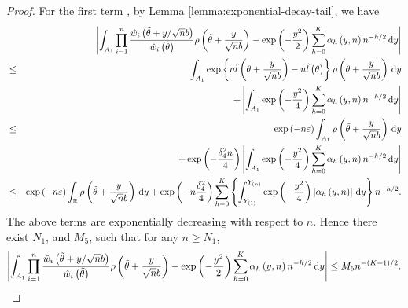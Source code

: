 \begin{proof}
For the first term%
, by Lemma \ref{lemma:exponential-decay-tail}, we have
\begin{eqnarray*}
 &  & \left|\int_{A_{1}}\prod_{i=1}^{n}\frac{\hat{w}_{i}\left(\tilde{\theta}+y/\sqrt{n}b\right)}{\hat{w}_{i}\left(\tilde{\theta}\right)}\rho\left(\tilde{\theta}+\frac{y}{\sqrt{n}b}\right)-\exp\left(-\frac{y^{2}}{2}\right)\sum_{h=0}^{K}\alpha_{h}\left(y,n\right)n^{-h/2}\,\mathrm{d} y\right|\\
 & \le & \int_{A_{1}}\exp\left\{ n\hat{l}\left(\tilde{\theta}+\frac{y}{\sqrt{n}b}\right)-n\hat{l}\left(\tilde{\theta}\right)\right\} \rho\left(\tilde{\theta}+\frac{y}{\sqrt{n}b}\right)\,\mathrm{d} y\\
 &  & +\left|\int_{A_{1}}\exp\left(-\frac{y^{2}}{4}\right)\sum_{h=0}^{K}\alpha_{h}\left(y,n\right)n^{-h/2}\,\mathrm{d} y\right|\\
 & \le & \exp\left(-n\varepsilon\right)\int_{A_{1}}\rho\left(\tilde{\theta}+\frac{y}{\sqrt{n}b}\right)\,\mathrm{d} y\\
 &  & +\exp\left(-\frac{\delta_{4}^{2}n}{4}\right)\left|\int_{A_{1}}\exp\left(-\frac{y^{2}}{4}\right)\sum_{h=0}^{K}\alpha_{h}\left(y,n\right)n^{-h/2}\,\mathrm{d} y\right|\\
 & \le & \exp\left(-n\varepsilon\right)\int_{\mathbb{R}}\rho\left(\tilde{\theta}+\frac{y}{\sqrt{n}b}\right)\,\mathrm{d} y+\exp\left(-n\frac{\delta_{4}^{2}}{4}\right)\sum_{h=0}^{K}\left\{ \int_{Y_{\left(1\right)}}^{Y_{\left(n\right)}}\exp\left(-\frac{y^{2}}{4}\right)\left|\alpha_{h}\left(y,n\right)\right|\,\mathrm{d} y\right\} n^{-h/2}.
\end{eqnarray*}
The above terms are exponentially decreasing with respect to $n$.
Hence there exist  $N_{1}$, and $M_{5}$, such that for any $n\ge N_{1}$,
\[
\left|\int_{A_{1}}\prod_{i=1}^{n}\frac{\hat{w}_{i}\left(\tilde{\theta}+y/\sqrt{n}b\right)}{\hat{w}_{i}\left(\tilde{\theta}\right)}\rho\left(\tilde{\theta}+\frac{y}{\sqrt{n}b}\right)-\exp\left(-\frac{y^{2}}{2}\right)\sum_{h=0}^{K}\alpha_{h}\left(y,n\right)n^{-h/2}\,\mathrm{d} y\right|\le M_{5}n^{-\left(K+1\right)/2}.
\]



\end{proof}
